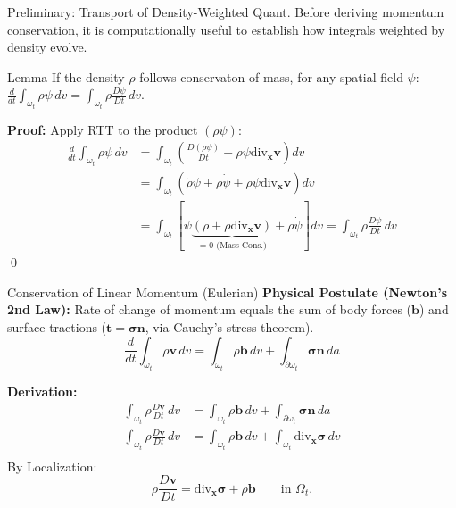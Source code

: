\documentclass[aspectratio=169]{beamer}
\begin{document}
\begin{frame}{Preliminary: Transport of Density-Weighted Quant.}
    Before deriving momentum conservation, it is computationally useful to establish how integrals weighted by density evolve.
    
    \begin{block}{Lemma}
    If the density $\rho$ follows conservaton of mass,  for any spatial field $\psi$: $\frac{d}{dt} \int_{\omega_t} \rho \psi \, dv = \int_{\omega_t} \rho \frac{D\psi}{Dt} \, dv$.
    
    \end{block}
    \begin{footnotesize}
    \textbf{Proof:} Apply RTT to the product $(\rho \psi)$:
    \begin{align*}
        \frac{d}{dt} \int_{\omega_t} \rho \psi \, dv &= \int_{\omega_t} \left( \frac{D(\rho\psi)}{Dt} + \rho\psi \text{div}_{\bm{x}} \bm{v} \right) dv \tag{RTT} \\
        &= \int_{\omega_t} \left( \dot{\rho}\psi + \rho\dot{\psi} + \rho\psi \text{div}_{\bm{x}} \bm{v} \right) dv \tag{Product Rule} \\
        &= \int_{\omega_t} \left[ \psi \underbrace{\left( \dot{\rho} + \rho \text{div}_{\bm{x}} \bm{v} \right)}_{=0 \text{ (Mass Cons.)}} + \rho \dot{\psi} \right] dv = \int_{\omega_t} \rho \frac{D\psi}{Dt} \, dv \tag{Simplify}
    \end{align*} \qed
\end{footnotesize}
\end{frame}

\begin{frame}{Conservation of Linear Momentum (Eulerian)}
    \textbf{Physical Postulate (Newton's 2nd Law):} Rate of change of momentum equals the sum of body forces ($\bm{b}$) and surface tractions ($\bm{t} = \bm{\sigma}\bm{n}$, via \alert{Cauchy's stress theorem}).
    $$ \frac{d}{dt} \int_{\omega_t} \rho \bm{v} \, dv = \int_{\omega_t} \rho \bm{b} \, dv + \int_{\partial \omega_t} \bm{\sigma} \bm{n} \, da $$
    
    \textbf{Derivation:}
    \begin{align*}
        \int_{\omega_t} \rho \frac{D\bm{v}}{Dt} \, dv &= \int_{\omega_t} \rho \bm{b} \, dv + \int_{\partial \omega_t} \bm{\sigma} \bm{n} \, da \tag{Apply Density Lemma} \\
        \int_{\omega_t} \rho \frac{D\bm{v}}{Dt} \, dv &= \int_{\omega_t} \rho \bm{b} \, dv + \int_{\omega_t} \text{div}_{\bm{x}} \bm{\sigma} \, dv \tag{Divergence Theorem} \\
    \end{align*}
    By Localization:
    $$ \rho \frac{D\bm{v}}{Dt} = \text{div}_{\bm{x}} \bm{\sigma} + \rho \bm{b} \qquad\text{in $\Omega_t$}.$$
\end{frame}
\end{document}

